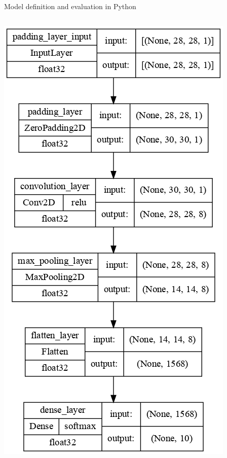 \documentclass[xcolor=table]{beamer}
\begin{document}
\begin{frame}{Model definition and evaluation in Python}
  \begin{columns}[T]
    \begin{column}{0.45\columnwidth}
      \includegraphics[scale=0.25]{Images/model.png}
    \end{column}
    \begin{column}{0.3\columnwidth}

\end{column}
\end{columns}
\end{frame}
\end{document}
